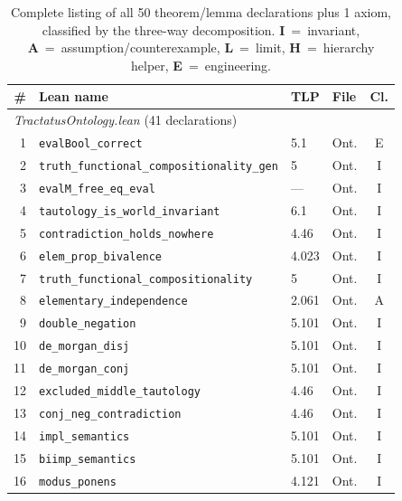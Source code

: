\documentclass[10pt, letterpaper]{article}
\theoremstyle{definition}
\theoremstyle{remark}
\begin{document}
\begin{table}[p]
\centering
\footnotesize
\caption{Complete listing of all 50 theorem/lemma declarations
  plus 1 axiom, classified by the three-way decomposition.
  \textbf{I}~=~invariant, \textbf{A}~=~assumption/counterexample,
  \textbf{L}~=~limit, \textbf{H}~=~hierarchy helper,
  \textbf{E}~=~engineering.}
\label{tab:decomposition}
\begin{tabular}{@{}rlllc@{}}
\toprule
\# & \textbf{Lean name} & \textbf{TLP} & \textbf{File} & \textbf{Cl.} \\
\midrule
\multicolumn{5}{l}{\emph{TractatusOntology.lean} (41 declarations)} \\
\midrule
 1 & \texttt{evalBool\_correct}                        & 5.1     & Ont. & E \\
 2 & \texttt{truth\_functional\_compositionality\_gen}  & 5       & Ont. & I \\
 3 & \texttt{evalM\_free\_eq\_eval}                     & ---     & Ont. & I \\
 4 & \texttt{tautology\_is\_world\_invariant}            & 6.1     & Ont. & I \\
 5 & \texttt{contradiction\_holds\_nowhere}              & 4.46    & Ont. & I \\
 6 & \texttt{elem\_prop\_bivalence}                      & 4.023   & Ont. & I \\
 7 & \texttt{truth\_functional\_compositionality}        & 5       & Ont. & I \\
 8 & \texttt{elementary\_independence}                   & 2.061   & Ont. & A \\
 9 & \texttt{double\_negation}                           & 5.101   & Ont. & I \\
10 & \texttt{de\_morgan\_disj}                           & 5.101   & Ont. & I \\
11 & \texttt{de\_morgan\_conj}                           & 5.101   & Ont. & I \\
12 & \texttt{excluded\_middle\_tautology}                & 4.46    & Ont. & I \\
13 & \texttt{conj\_neg\_contradiction}                   & 4.46    & Ont. & I \\
14 & \texttt{impl\_semantics}                            & 5.101   & Ont. & I \\
15 & \texttt{biimp\_semantics}                           & 5.101   & Ont. & I \\
16 & \texttt{modus\_ponens}                              & 4.121   & Ont. & I \\

\end{tabular}
\end{table}
\end{document}
